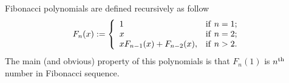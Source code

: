 \documentclass[12pt]{article}
\begin{document}
Fibonacci polynomials are defined recursively as follow
$$
F_n(x):=
\left\{
 \begin{array}{ll}
  1 & {\rm if~} n=1;\\
  x & {\rm if~} n=2;\\
  x F_{n-1}(x)+F_{n-2}(x), & {\rm if~} n>2.
 \end{array}
\right.
$$
The main (and obvious) property of this polynomials is that $F_n(1)$ is $n^{\rm th}$ number in Fibonacci sequence.

\end{document}
